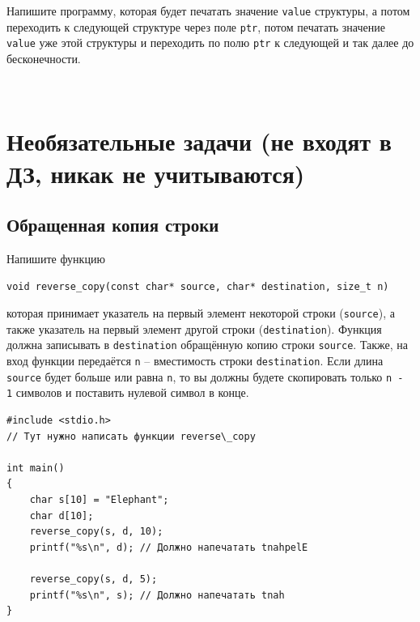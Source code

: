 \documentclass[10pt]{article}
\begin{document}
Напишите программу, которая будет печатать значение \texttt{value} структуры, а потом переходить к следующей структуре через поле \texttt{ptr}, потом печатать значение \texttt{value} уже этой структуры и переходить по полю \texttt{ptr} к следующей и так далее до бесконечности.




\newpage
~
\newpage
\section*{Необязательные задачи (не входят в ДЗ, никак не учитываются)}
\setcounter{subsection}{0}

\subsection{Обращенная копия строки}
Напишите функцию 
\begin{lstlisting}
void reverse_copy(const char* source, char* destination, size_t n)
\end{lstlisting}
которая принимает указатель на первый элемент некоторой строки (\texttt{source}), а также указатель на первый элемент другой строки (\texttt{destination}). Функция должна записывать в \texttt{destination} обращённую копию строки \texttt{source}. Также, на вход функции передаётся \texttt{n} -- вместимость строки \texttt{destination}. Если длина \texttt{source} будет больше или равна \texttt{n}, то вы должны будете скопировать только \texttt{n - 1} символов и поставить нулевой символ в конце.

\begin{lstlisting}
#include <stdio.h>
// Тут нужно написать функции reverse\_copy

int main() 
{
    char s[10] = "Elephant";
    char d[10];
    reverse_copy(s, d, 10);
    printf("%s\n", d); // Должно напечатать tnahpelE
    
    reverse_copy(s, d, 5);
    printf("%s\n", s); // Должно напечатать tnah
}
\end{lstlisting}
\end{document}
